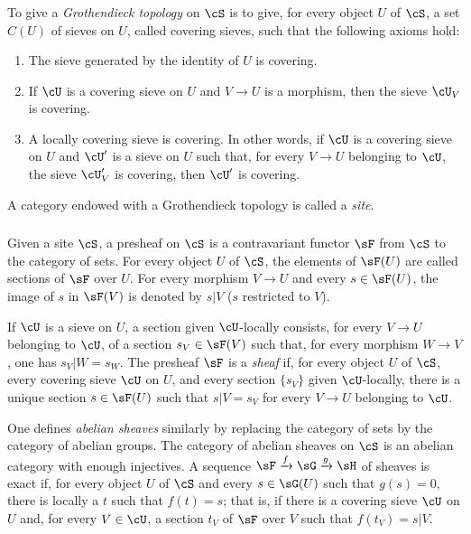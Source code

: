 \documentclass[12pt,oneside,english]{smfbook}
\begin{document}
\subsubsection{}\label{I:1-6-2}

To give a \emph{Grothendieck topology} on $\cS$ is to give, for every object $U$ of $\cS$, a set $C(U)$ of sieves on $U$, called covering sieves, such that the following axioms hold:
\begin{enumerate}[\indent a)]
  \item The sieve generated by the identity of $U$ is covering.
  \item If $\cU$ is a covering sieve on $U$ and $V\to U$ is a morphism, then the sieve $\cU_V$ is covering.
  \item A locally covering sieve is covering. In other words, if $\cU$ is a covering sieve on $U$ and $\cU'$ is a sieve on $U$ such that, for every $V\to U$ belonging to $\cU$, the sieve $\cU'_V$ is covering, then $\cU'$ is covering.
\end{enumerate}

A category endowed with a Grothendieck topology is called a \emph{site}.

\subsubsection{}\label{I:1-6-3}

Given a site $\cS$, a presheaf on $\cS$ is a contravariant functor $\sF$ from $\cS$ to the category of sets. For every object $U$ of $\cS$, the elements of $\sF(U)$ are called sections of $\sF$ over $U$. For every morphism $V\to U$ and every $s\in\sF(U)$, the image of $s$ in $\sF(V)$ is denoted by $s|V$ ($s$ restricted to $V$).

If $\cU$ is a sieve on $U$, a section given $\cU$-locally consists, for every $V\to U$ belonging to $\cU$, of a section $s_V\in\sF(V)$ such that, for every morphism $W\to V$, one has $s_V|W=s_W$. The presheaf $\sF$ is a \emph{sheaf} if, for every object $U$ of $\cS$, every covering sieve $\cU$ on $U$, and every section $\{s_V\}$ given $\cU$-locally, there is a unique section $s\in\sF(U)$ such that $s|V=s_V$ for every $V\to U$ belonging to $\cU$.

One defines \emph{abelian sheaves} similarly by replacing the category of sets by the category of abelian groups. The category of abelian sheaves on $\cS$ is an abelian category with enough injectives. A sequence $\sF\xrightarrow f\sG\xrightarrow g\sH$ of sheaves is exact if, for every object $U$ of $\cS$ and every $s\in\sG(U)$ such that $g(s)=0$, there is locally a $t$ such that $f(t)=s$; that is, if there is a covering sieve $\cU$ on $U$ and, for every $V\in\cU$, a section $t_V$ of $\sF$ over $V$ such that $f(t_V)=s|V$.
\end{document}

